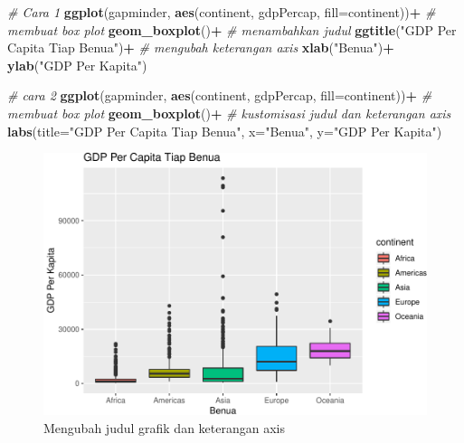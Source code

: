 \documentclass[]{book}
\newenvironment{Shaded}{\begin{snugshade}}{\end{snugshade}}
\newcommand{\KeywordTok}[1]{\textcolor[rgb]{0.13,0.29,0.53}{\textbf{#1}}}
\newcommand{\DataTypeTok}[1]{\textcolor[rgb]{0.13,0.29,0.53}{#1}}
\newcommand{\StringTok}[1]{\textcolor[rgb]{0.31,0.60,0.02}{#1}}
\newcommand{\CommentTok}[1]{\textcolor[rgb]{0.56,0.35,0.01}{\textit{#1}}}
\newcommand{\OperatorTok}[1]{\textcolor[rgb]{0.81,0.36,0.00}{\textbf{#1}}}
\newcommand{\NormalTok}[1]{#1}
\begin{document}
\begin{Shaded}
\begin{Highlighting}[]
\CommentTok{# Cara 1}
\KeywordTok{ggplot}\NormalTok{(gapminder, }\KeywordTok{aes}\NormalTok{(continent, gdpPercap, }\DataTypeTok{fill=}\NormalTok{continent))}\OperatorTok{+}
\StringTok{  }\CommentTok{# membuat box plot}
\StringTok{  }\KeywordTok{geom_boxplot}\NormalTok{()}\OperatorTok{+}
\StringTok{  }\CommentTok{# menambahkan judul}
\StringTok{  }\KeywordTok{ggtitle}\NormalTok{(}\StringTok{"GDP Per Capita Tiap Benua"}\NormalTok{)}\OperatorTok{+}
\StringTok{  }\CommentTok{# mengubah keterangan axis}
\StringTok{  }\KeywordTok{xlab}\NormalTok{(}\StringTok{"Benua"}\NormalTok{)}\OperatorTok{+}
\StringTok{  }\KeywordTok{ylab}\NormalTok{(}\StringTok{"GDP Per Kapita"}\NormalTok{)}
\end{Highlighting}
\end{Shaded}

\begin{Shaded}
\begin{Highlighting}[]
\CommentTok{# cara 2}
\KeywordTok{ggplot}\NormalTok{(gapminder, }\KeywordTok{aes}\NormalTok{(continent, gdpPercap, }\DataTypeTok{fill=}\NormalTok{continent))}\OperatorTok{+}
\StringTok{  }\CommentTok{# membuat box plot}
\StringTok{  }\KeywordTok{geom_boxplot}\NormalTok{()}\OperatorTok{+}
\StringTok{  }\CommentTok{# kustomisasi judul dan keterangan axis}
\StringTok{  }\KeywordTok{labs}\NormalTok{(}\DataTypeTok{title=}\StringTok{"GDP Per Capita Tiap Benua"}\NormalTok{,}
       \DataTypeTok{x=}\StringTok{"Benua"}\NormalTok{, }\DataTypeTok{y=}\StringTok{"GDP Per Kapita"}\NormalTok{)}
\end{Highlighting}
\end{Shaded}

\begin{figure}

{\centering \includegraphics[width=0.7\linewidth]{EnvStat_files/figure-latex/ggtitle-1} 

}

\caption{Mengubah judul grafik dan keterangan axis}\label{fig:ggtitle}
\end{figure}
\end{document}
